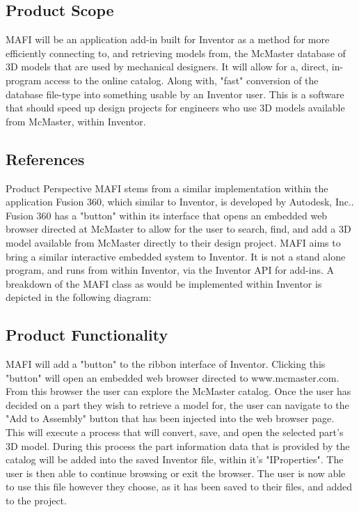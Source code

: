 \documentclass[12pt, letterpaper]{article}
\begin{document}
\subsection{Product Scope}
MAFI will be an application add-in built for Inventor as a method for more efficiently connecting to, and retrieving models from, the McMaster database of 3D models that are used by mechanical designers. It will allow for a, direct, in-program access to the online catalog. Along with, "fast" conversion of the database file-type into something usable by an Inventor user. This is a software that should speed up design projects for engineers who use 3D models available from McMaster, within Inventor.
\subsection{References}
\begingroup
\renewcommand{\section}[2]{}


\endgroup
\section{General Description}
\subsection{Product Perspective}
MAFI stems from a similar implementation within the application Fusion 360, which similar to Inventor, is developed by Autodesk, Inc.. Fusion 360 
has a "button" within its interface that opens an embedded web browser directed at McMaster to allow for the user to search, find, and add a 3D model 
available from McMaster directly to their design project. MAFI aims to bring a similar interactive embedded system to Inventor. It is not a stand alone 
program, and runs from within Inventor, via the Inventor API for add-ins. A breakdown of the MAFI class as would be implemented within Inventor is depicted 
in the following diagram:

\subsection{Product Functionality}
MAFI will add a "button" to the ribbon interface of Inventor. Clicking this "button" will open an embedded web browser directed to www.mcmaster.com. 
From this browser the user can explore the McMaster catalog. Once the user has decided on a part they wish to retrieve a model for, the user can navigate 
to the "Add to Assembly" button that has been injected into the web browser page. This will execute a process that will convert, save, and open the selected
part's 3D model. During this process the part information data that is provided by the catalog will be added into the saved Inventor file, within it's "IProperties".
 The user is then able to continue browsing or exit the browser. The user is now able to use this file however they choose, as it has been saved to their files, and added to the project.
\end{document}
